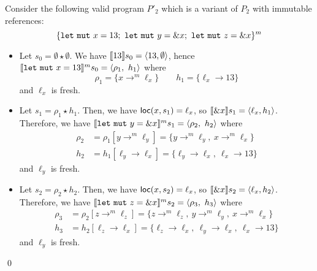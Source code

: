 \begin{example}
  Consider the following valid program $P'_2$ which is a variant
  of $P_2$ with immutable references:
  \[
    \{
      \mathtt{let\ mut}\ x = 13;\
      \mathtt{let\ mut}\ y = \borrow x;\
      \mathtt{let\ mut}\ z = \borrow x
    \}^m
  \]
  \begin{itemize}
    \item Let $s_0=\emptyset \star \emptyset$.
    We have $\den[13]{s_0} = \langle 13,\emptyset\rangle$, hence
    $\denl[\mathtt{let\ mut}\ x = 13]{m}{s_0} =
    \langle \rho_1,\ h_1\rangle$ where
    \[\rho_1=\{x\to^m\ell_x\} \qquad
    h_1 = \{\ell_x\to 13\}\]
    and $\ell_x$ is fresh.
    \item Let $s_1 = \rho_1 \star h_1$.
    Then, we have $\loc(x,s_1) = \ell_x$, so
    $\den[\borrow x]{s_1} = \langle \ell_x,h_1\rangle$.
    Therefore, we have
    $\denl[\mathtt{let\ mut}\ y = \borrow x]{m}{s_1} =
    \langle \rho_2,\ h_2\rangle$
    where
    \begin{align*}
      \rho_2 & = \rho_1[y\to^m\ell_y] = \{y\to^m\ell_y,\ x\to^m\ell_x\}\\
      h_2 & = h_1[\ell_y\to \ell_x] =
      \{\ell_y\to \ell_x,\ \ell_x\to 13\}
    \end{align*}
    and $\ell_y$ is fresh.
    \item Let $s_2 = \rho_2 \star h_2$.
    Then, we have $\loc(x,s_2) = \ell_x$, so
    $\den[\borrow x]{s_2} = \langle \ell_x,h_2\rangle$.
    Therefore, we have
    $\denl[\mathtt{let\ mut}\ z = \borrow x]{m}{s_2} =
    \langle \rho_3,\ h_3\rangle$
    where
    \begin{align*}
      \rho_3 & = \rho_2[z\to^m\ell_z] = \{z\to^m\ell_z,\ y\to^m\ell_y,\ x\to^m\ell_x\}\\
      h_3 & = h_2[\ell_z\to \ell_x] =
      \{\ell_z\to \ell_x,\ \ell_y\to \ell_x,\ \ell_x\to 13\}
    \end{align*}
    and $\ell_y$ is fresh.
  \end{itemize}
  \qed
\end{example}

